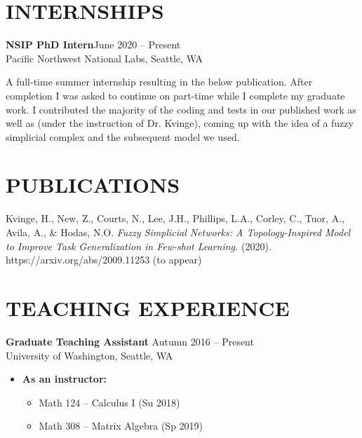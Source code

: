 \documentclass[margin]{res} %
\begin{document}
\begin{resume}
\section{INTERNSHIPS}
\textbf{NSIP PhD Intern}\hfill June 2020 -- Present\\
Pacific Northwest National Labs, Seattle, WA

A full-time summer internship resulting in the below publication. After completion I was asked to continue on part-time
while I complete my graduate work. I contributed the majority of the coding and tests in our published work as well as
(under the instruction of Dr. Kvinge), coming up with the idea of a fuzzy simplicial complex and the subsequent model we used.

\section{PUBLICATIONS}
Kvinge, H., New, Z., Courts, N., Lee, J.H., Phillips, L.A., Corley, C., Tuor, A., Avila, A., \& Hodas, N.O.
\textit{Fuzzy Simplicial Networks: A Topology-Inspired Model to Improve Task Generalization in Few-shot Learning.} (2020).
https://arxiv.org/abs/2009.11253 (to appear)


 
\section{TEACHING EXPERIENCE}

{\bf Graduate Teaching Assistant} \hfill Autumn 2016 -- Present \\
University of Washington, Seattle, WA

\begin{itemize} \itemsep -1pt %
\item\textbf{As an instructor:} 
\begin{itemize}
	\item Math 124 -- Calculus I (Su 2018)

	\item Math 308 -- Matrix Algebra (Sp 2019)\vspace{5pt}
	

\end{itemize}
\end{itemize}
\end{resume}
\end{document}
